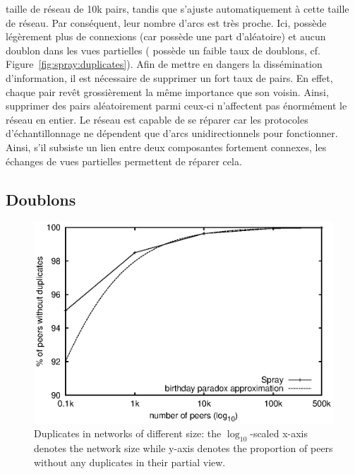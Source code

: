 \begin{asparadesc}
  taille de réseau de 10k pairs, tandis que \SPRAY s'ajuste automatiquement à
  cette taille de réseau. Par conséquent, leur nombre d'arcs est très
  proche. Ici, \CYCLON possède légèrement plus de connexions (car \SPRAY possède
  une part d'aléatoire) et aucun doublon dans les vues partielles (\SPRAY
  possède un faible taux de doublons,
  cf. Figure~\ref{fig:spray:duplicates}). Afin de mettre en dangers la
  dissémination d'information, il est nécessaire de supprimer un fort taux de
  pairs. En effet, chaque pair revêt grossièrement la même importance que son
  voisin. Ainsi, supprimer des pairs aléatoirement parmi ceux-ci n'affectent pas
  énormément le réseau en entier. Le réseau est capable de se réparer car les
  protocoles d'échantillonnage ne dépendent que d'arcs unidirectionnels pour
  fonctionner. Ainsi, s'il subsiste un lien entre deux composantes fortement
  connexes, les échanges de vues partielles permettent de réparer cela.
\end{asparadesc}

\subsection{Doublons}

\begin{figure}
  \centering
  \includegraphics[width=.8\textwidth]{img/spray/duplicates.eps}
  \caption{\label{fig:duplicates}Duplicates in networks of different size: the
    $\log_{10}$-scaled x-axis denotes the network size while y-axis denotes the
    proportion of peers without any duplicates in their partial view.}
\end{figure}




